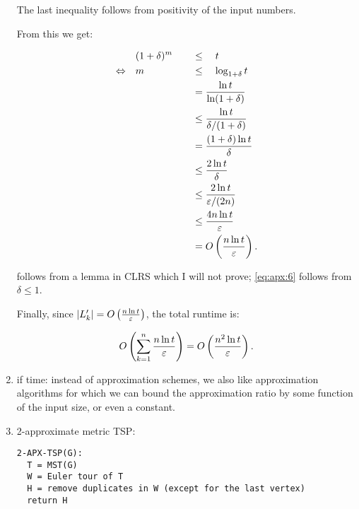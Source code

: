 \begin{enumerate}
    The last inequality follows from positivity of the input numbers.

    From this we get:

    \begin{textred}
      \begin{alignat}{3}
        &(1 + \delta)^m         \quad&&\leq\quad t\\
        \Leftrightarrow\quad& m \quad&&\leq\quad \log_{1 + \delta} t\\
                                    &&&= \frac{\ln t}{\ln (1 + \delta)}\\
                                    &&&\leq \frac{\ln t}{\delta/(1 +
                                    \delta)}\label{eq:apx:5}\\
                                    &&&= \frac{(1 + \delta)\ln t}{\delta}\\
                                    &&&\leq \frac{2\ln t}{\delta}\label{eq:apx:6}\\
                                    &&&\leq \frac{2\ln t}{\varepsilon / (2n)}\\
                                    &&&\leq \frac{4n\ln t}{\varepsilon}\\
                                    &&&= O\left(\frac{n \ln t}{\varepsilon}\right).
      \end{alignat}
    \end{textred}

     follows from a lemma in CLRS which I will not prove;
    \cref{eq:apx:6} follows from $\delta \leq 1$.

    Finally, since $|L'_k| = O\left(\frac{n \ln t}{\varepsilon}\right)$, the total
    runtime is:


    \begin{textred}
      \begin{alignat}{3}
        O\left(\sum_{k = 1}^n \frac{n \ln t}{\varepsilon}\right) = O\left(\frac{n^2 \ln t}{\varepsilon}\right).
      \end{alignat}
    \end{textred}


  \item if time: instead of approximation schemes, we also like
    approximation algorithms for which we can bound the approximation ratio by
    some function of the input size, or even a constant.


  \item 2-approximate metric TSP:
\begin{verbatim}
2-APX-TSP(G):
  T = MST(G)
  W = Euler tour of T
  H = remove duplicates in W (except for the last vertex)
  return H
\end{verbatim}


\end{enumerate}
